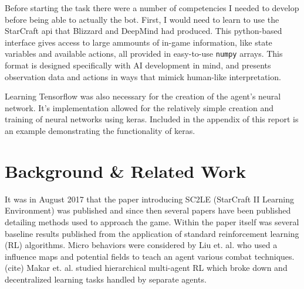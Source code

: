 \documentclass{amsart}
\theoremstyle{definition}
\begin{document}
Before starting the task there were a number of competencies I needed to develop before being able to actually the bot.
First, I would need to learn to use the StarCraft api that Blizzard and DeepMind had produced.
This python-based interface gives access to large ammounts of in-game information, like state variables and available actions, all provided in easy-to-use {\tt numpy} arrays.
This format is designed specifically with AI development in mind, and presents observation data and actions in ways that mimick human-like interpretation.

Learning Tensorflow was also necessary for the creation of the agent's neural network.
It's implementation allowed for the relatively simple creation and training of neural networks using keras.
Included in the appendix of this report is an example demonstrating the functionality of keras.








\section{Background \& Related Work}


It was in August 2017 that the paper introducing SC2LE (StarCraft II Learning Environment) was published and since then several papers have been published detailing methods used to approach the game.
Within the paper itself was several baseline results published from the application of standard reinforcement learning (RL) algorithms.
Micro behaviors were considered by Liu et. al. who used a influence maps and potential fields to teach an agent various combat techniques. (cite)
Makar et. al. studied hierarchical multi-agent RL which broke down and decentralized learning tasks handled by separate agents.
\end{document}
